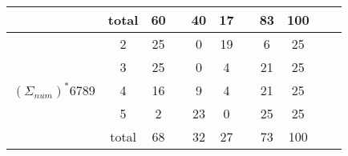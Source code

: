 \begin{table*}[]
\begin{tabular}{c|c|ccc|ccc|ccc}
                                                       & total & 60   &        & 40      & 17    &        & 83       & 100 &       &                      \\ \hline
    \multirow{5}{*}{$(\Sigma_{num})^*$6789}      & 2   & 25   &        & 0       & 19    &        & 6        & 25  &       & \multicolumn{1}{l}{} \\
                                                       & 3   & 25   &        & 0       & 4     &        & 21       & 25  &       & \multicolumn{1}{l}{} \\
                                                       & 4   & 16   &        & 9       & 4     &        & 21       & 25  &       & \multicolumn{1}{l}{} \\
                                                       & 5   & 2    &        & 23      & 0     &        & 25       & 25  &       & \multicolumn{1}{l}{} \\
                                                       & total & 68   &        & 32      & 27    &        & 73       & 100 &       &                     
    \end{tabular}
\end{table*}